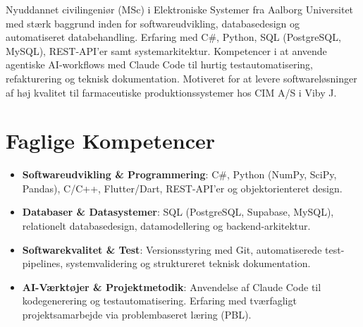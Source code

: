\documentclass[11pt,a4paper,sans]{moderncv}
\begin{document}
\makecvtitle


\vspace{6pt}
\small{Nyuddannet civilingeniør (MSc) i Elektroniske Systemer fra Aalborg Universitet med stærk baggrund inden for softwareudvikling, databasedesign og automatiseret databehandling. Erfaring med C\#, Python, SQL (PostgreSQL, MySQL), REST-API'er samt systemarkitektur. Kompetencer i at anvende agentiske AI-workflows med Claude Code til hurtig testautomatisering, refakturering og teknisk dokumentation. Motiveret for at levere softwareløsninger af høj kvalitet til farmaceutiske produktionssystemer hos CIM A/S i Viby J.}


\section{Faglige Kompetencer}
\vspace{1pt}
\begin{itemize}

\item \textbf{Softwareudvikling \& Programmering}: C\#, Python (NumPy, SciPy, Pandas), C/C++, Flutter/Dart, REST-API'er og objektorienteret design.

\item \textbf{Databaser \& Datasystemer}: SQL (PostgreSQL, Supabase, MySQL), relationelt databasedesign, datamodellering og backend-arkitektur.

\item \textbf{Softwarekvalitet \& Test}: Versionsstyring med Git, automatiserede test-pipelines, systemvalidering og struktureret teknisk dokumentation.

\item \textbf{AI-Værktøjer \& Projektmetodik}: Anvendelse af Claude Code til kodegenerering og testautomatisering. Erfaring med tværfagligt projektsamarbejde via problembaseret læring (PBL).

\end{itemize}

\end{document}
